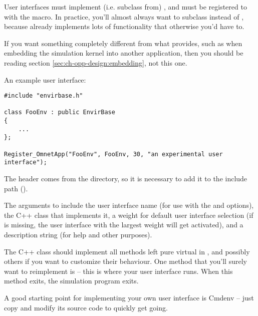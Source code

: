 User interfaces must implement (i.e. subclass from) ,
and must be registered to {\opp} with the  macro.
In practice, you'll almost always want to subclass 
instead of , because  already
implements lots of functionality that otherwise you'd have to.

\begin{note}
If you want something completely different from what 
provides, such as when embedding the simulation kernel into another
application, then you should be reading section \ref{sec:ch-opp-design:embedding},
not this one.
\end{note}

An example user interface:

\begin{verbatim}
#include "envirbase.h"

class FooEnv : public EnvirBase
{
    ...
};

Register_OmnetApp("FooEnv", FooEnv, 30, "an experimental user interface");
\end{verbatim}

The  header comes from the  directory,
so it is necessary to add it to the include path ().

The arguments to  include the user interface name
(for use with the  and  options),
the C++ class that implements it, a weight for default user interface selection
(if  is missing, the user interface with the largest weight will get
activated), and a description string (for help and other purposes).

The C++ class should implement all methods left pure virtual in
, and possibly others if you want to customize
their behaviour. One method that you'll surely want to reimplement is
 -- this is where your user interface runs. When this method
exits, the simulation program exits.

\begin{note}
A good starting point for implementing your own user interface is
Cmdenv -- just copy and modify its source code to quickly get going.
\end{note}



